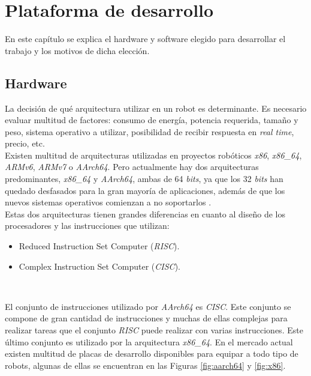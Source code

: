 \chapter{Plataforma de desarrollo}
\label{cap:capitulo3}
En este capítulo se explica el hardware y software elegido para desarrollar el trabajo y los motivos de dicha elección.\\

\section{Hardware}
\label{sec:arquitectura}
La decisión de qué arquitectura utilizar en un robot es determinante. Es necesario evaluar multitud de factores: consumo de energía, potencia requerida, tamaño y peso, sistema operativo a utilizar, posibilidad de recibir respuesta en \textit{real time}, precio, etc.\\

Existen multitud de arquitecturas utilizadas en proyectos robóticos \textit{x86}, \textit{x86\_64}, \textit{ARMv6}, \textit{ARMv7} o \textit{AArch64}. Pero actualmente hay dos arquitecturas predominantes, \textit{x86\_64} y \textit{AArch64}, ambas de 64 \textit{bits}, ya que los 32 \textit{bits} han quedado desfasados para la gran mayoría de aplicaciones, además de que los nuevos sistemas operativos comienzan a no soportarlos \cite{canonical32bits}.\\ 

Estas dos arquitecturas tienen grandes diferencias en cuanto al diseño de los procesadores y las instrucciones que utilizan:
\begin{itemize}
	\item Reduced Instruction Set Computer (\textit{RISC}).
	\item Complex Instruction Set Computer (\textit{CISC}).
\end{itemize}\

El conjunto de instrucciones utilizado por \textit{AArch64} es \textit{CISC}. Este conjunto se compone de gran cantidad de instrucciones y muchas de ellas complejas para realizar tareas que el conjunto \textit{RISC} puede realizar con varias instrucciones. Este último conjunto es utilizado por la arquitectura \textit{x86\_64}. En el mercado actual existen multitud de placas de desarrollo disponibles para equipar a todo tipo de robots, algunas de ellas se encuentran en las Figuras \ref{fig:aarch64} y \ref{fig:x86}.\\

